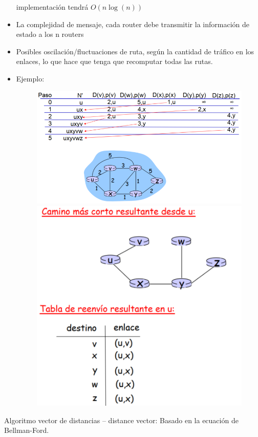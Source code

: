 \documentclass[12pt, twoside, openright]{report} %
\begin{document}
\begin{itemize}
	      implementación tendrá \(O(n \log (n))\)
	\item La complejidad de mensaje, cada router debe transmitir la
	      información de estado a los n routers
	\item Posibles oscilación/fluctuaciones de ruta, según la cantidad de
	      tráfico en los enlaces, lo que hace que tenga que recomputar todas
	      las rutas.
	\item Ejemplo:
	      \begin{figure}[H]
		      {\includegraphics[scale=.35]{Untitled 40.png}\includegraphics[scale=.35]{Untitled 41.png}}
	      \end{figure}

\end{itemize}
\pagebreak
Algoritmo vector de distancias -- distance vector: Basado en la
ecuación de Bellman-Ford.
\end{document}
